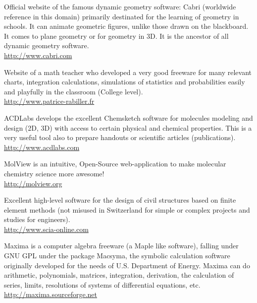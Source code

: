 	{\Large {}}{\Large {}} Official website of the famous dynamic geometry software: Cabri (worldwide reference in this domain) primarily destinated for the learning of geometry in schools. It can animate geometric figures, unlike those drawn on the blackboard. It comes to plane geometry or for geometry in 3D. It is the ancestor of all dynamic geometry software.\\
	\href{http://www.cabri.com}{\color{blue}http://www.cabri.com}
	
	{\Large {}}{\Large {}}{\Large {}}\bcdfrance{} Website of a math teacher who developed a very good freeware for many relevant charts, integration calculations, simulations of statistics and probabilities easily and playfully in the classroom (College level).\\
	\href{http://www.patrice-rabiller.fr}{\color{blue}http://www.patrice-rabiller.fr}
	
	{\Large {}}{\Large {}} ACDLabs develops the excellent Chemsketch software for molecules modeling and design (2D, 3D) with access to certain physical and chemical properties. This is a very useful tool also to prepare handouts or scientific articles (publications).\\
	\href{http://www.acdlabs.com}{\color{blue}http://www.acdlabs.com}
	
	{\Large {}}{\Large {}}{\Large {}} MolView is an intuitive, Open-Source web-application to make molecular chemistry science more awesome!\\
	\href{http://molview.org}{\color{blue}http://molview.org}
	
	{\Large {}}{\Large {}} Excellent high-level software for the design of civil structures based on finite element methods (not misused in Switzerland for simple or complex projects and studies for engineers).\\
	\href{http://www.scia-online.com}{\color{blue}http://www.scia-online.com}
	
	{\Large {}}{\Large {}} Maxima is a computer algebra freeware (a Maple like software), falling under GNU GPL under the package Macsyma, the symbolic calculation software originally developed for the needs of U.S. Department of Energy. Maxima can do arithmetic, polynomials, matrices, integration, derivation, the calculation of series, limits, resolutions of systems of differential equations, etc.\\
	\href{http://maxima.sourceforge.net}{\color{blue}http://maxima.sourceforge.net}
	
